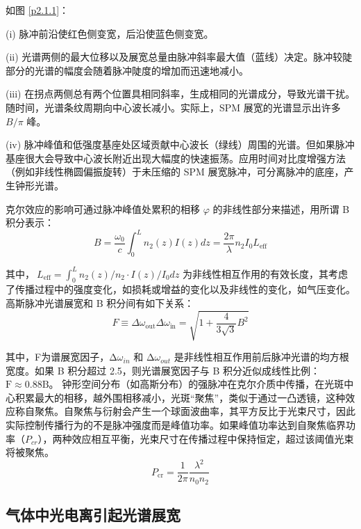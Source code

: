 \documentclass[14pt,a4paper,oneside]{article}
\numberwithin{equation}{subsection}             %
\numberwithin{figure}{subsection}               %
\begin{document}
如图 \ref{p2.1.1}：

(i) 脉冲前沿使红色侧变宽，后沿使蓝色侧变宽。 

(ii) 光谱两侧的最大位移以及展宽总量由脉冲斜率最大值（蓝线）决定。脉冲较陡部分的光谱的幅度会随着脉冲陡度的增加而迅速地减小。

(iii) 在拐点两侧总有两个位置具相同斜率，生成相同的光谱成分，导致光谱干扰。随时间，光谱条纹周期向中心波长减小。实际上，SPM 展宽的光谱显示出许多 $B/\pi$ 峰。 

(iv) 脉冲峰值和低强度基座处区域贡献中心波长（绿线）周围的光谱。但如果脉冲基座很大会导致中心波长附近出现大幅度的快速振荡。应用时间对比度增强方法（例如非线性椭圆偏振旋转）于未压缩的 SPM 展宽脉冲，可分离脉冲的底座，产生钟形光谱。

克尔效应的影响可通过脉冲峰值处累积的相移 $\varphi$ 的非线性部分来描述，用所谓 B 积分表示：
\begin{equation}
    B=\frac{\omega_0}{c}\int_{0}^{L}{n_2\left(z\right)I\left(z\right)dz}=\frac{2\pi}{\lambda}n_2I_0L_{\mathrm{eff}}
    \label{eq:2.1.3}
\end{equation}

其中，$\ L_{\mathrm{eff}}=\int_{0}^{L}{n_2\left(z\right)/n_2}\cdot I\left(z\right)/I_0dz$ 为非线性相互作用的有效长度，其考虑了传播过程中的强度变化，如损耗或增益的变化以及非线性的变化，如气压变化。高斯脉冲光谱展宽和 B 积分间有如下关系：
\begin{equation}
    F\equiv \Delta\omega_{\mathrm{out}}\Delta\omega_{\mathrm{in}}=\sqrt{1+\frac{4}{3\sqrt{3}}B^2}
    \label{eq:2.1.4}
\end{equation}

其中，F为谱展宽因子，$\mathrm{\Delta}\omega_{in}$ 和 $\mathrm{\Delta}\omega_{out}$ 是非线性相互作用前后脉冲光谱的均方根宽度。如果 B 积分超过 2.5，则光谱展宽因子与 B 积分近似成线性比例：$\mathrm{F}\approx0.88\mathrm{B}$。
钟形空间分布（如高斯分布）的强脉冲在克尔介质中传播，在光斑中心积累最大的相移，越外围相移减小，光斑“聚焦”，类似于通过一凸透镜，这种效应称自聚焦。自聚焦与衍射会产生一个球面波曲率，其平方反比于光束尺寸，因此实际控制传播行为的不是脉冲强度而是峰值功率。如果峰值功率达到自聚焦临界功率（$P_{cr}$），两种效应相互平衡，光束尺寸在传播过程中保持恒定，超过该阈值光束将被聚焦。
\begin{equation}
    P_{\mathrm{cr}}=\frac{1}{2\pi}\frac{\lambda^2}{n_0n_2}
    \label{eq:2.1.5}
\end{equation}

\subsection{气体中光电离引起光谱展宽}
\end{document}
